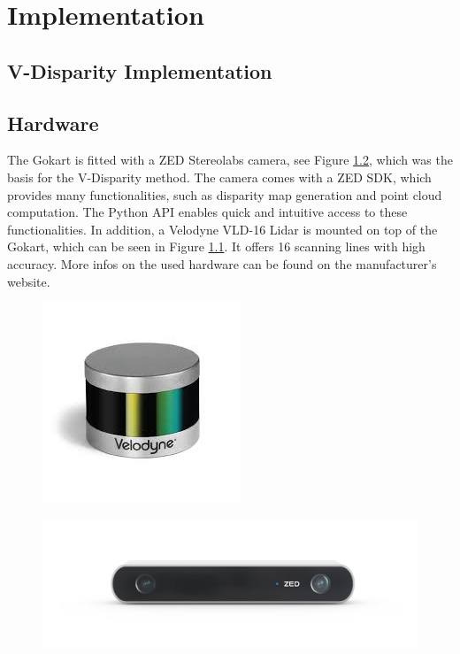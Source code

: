 
\chapter{Implementation}
\label{chp:Implementation}



\section{V-Disparity Implementation}
\label{vdisp_impl}


\section{Hardware}


The Gokart is fitted with a ZED Stereolabs camera, see Figure \ref{fig:zedproductmain}, which was the basis for the V-Disparity method. The camera comes with a ZED SDK, which provides many functionalities, such as disparity map generation and point cloud computation. The Python API enables quick and intuitive access to these functionalities.
In addition, a Velodyne VLD-16 Lidar is mounted on top of the Gokart, which can be seen in Figure \ref{fig:lidar}. It offers 16 scanning lines with high accuracy.
More infos on the used hardware can be found on the manufacturer's website.

\begin{figure}
	\centering
	\includegraphics[width=0.5\linewidth]{Figures/lidar}
	\caption[Velodyne Vld-16 Lidar Sensor]{}
	\label{fig:lidar}
\end{figure}

\begin{figure}
	\centering
	\includegraphics[width=0.7\linewidth]{Figures/ZED_product_main}
	\caption[ZED Stereolabs Camera]{}
	\label{fig:zedproductmain}
\end{figure}



